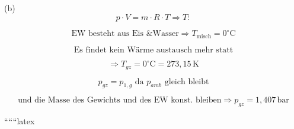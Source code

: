 (b) \\
\[
p \cdot V = m \cdot R \cdot T \Rightarrow T:
\]

\[
\text{EW besteht aus Eis \& Wasser} \Rightarrow T_{\text{misch}} = 0^\circ \text{C}
\]

\[
\text{Es findet kein Wärme austausch mehr statt}
\]

\[
\Rightarrow T_{gz} = 0^\circ \text{C} = 273,15 \, \text{K}
\]

\[
p_{gz} = p_{1, g} \text{ da } p_{amb} \text{ gleich bleibt}
\]

\[
\text{und die Masse des Gewichts und des EW konst. bleiben} \Rightarrow p_{gz} = 1,407 \, \text{bar}
\]

``````latex